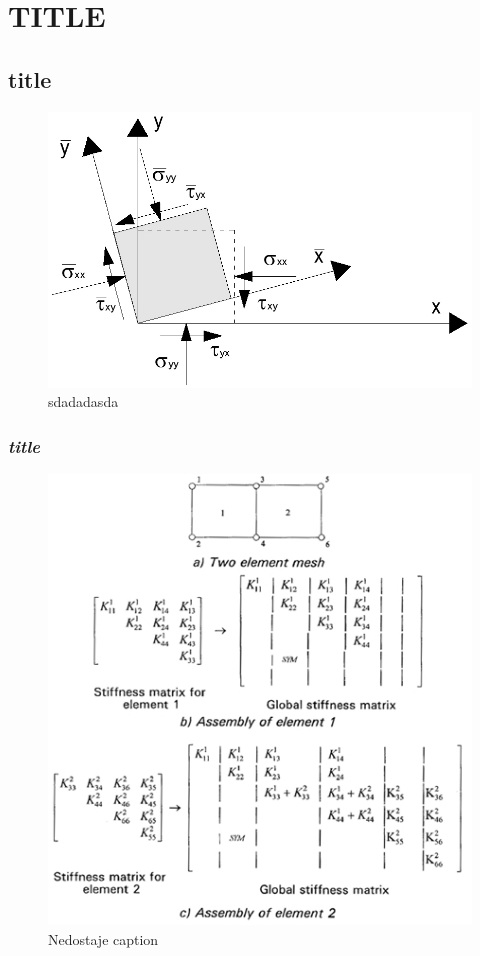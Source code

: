 \chapter{\uppercase{title}}
\lipsum[1-3]


\section{title}

\lipsum[1-3]


\begin{figure}
	\centering
	\includegraphics[width=0.7\linewidth]{Slike/2dtrans}
	\caption{sdadadasda}
	\label{fig:2dtrans}
\end{figure}


\subsection{\textit{title}}


\lipsum[1-3]

\begin{figure}
	\centering
	\includegraphics[width=0.7\linewidth]{Slike/assembly}
	\caption{Nedostaje caption}
	\label{fig:assembly}
\end{figure}


\lipsum[1-3] \cite{Gutierrez2009,doi:10.1680/geot.1986.36.1.65,krahn}
\lipsum[1-3]